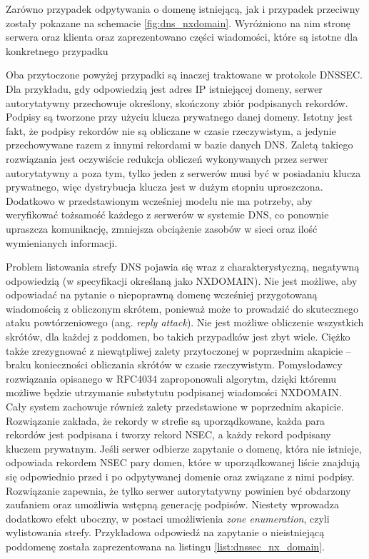 Zarówno przypadek odpytywania o domenę istniejącą, jak i przypadek przeciwny zostały pokazane na schemacie \ref{fig:dns_nxdomain}.
Wyróżniono na nim stronę serwera oraz klienta oraz zaprezentowano części wiadomości, które są istotne dla konkretnego przypadku

Oba przytoczone powyżej przypadki są inaczej traktowane w protokole DNSSEC. Dla przykładu, gdy odpowiedzią jest
adres IP istniejącej domeny, serwer autorytatywny przechowuje określony, skończony zbiór podpisanych rekordów. Podpisy są tworzone
przy użyciu klucza prywatnego danej domeny. Istotny jest fakt, że podpisy rekordów nie są obliczane w czasie rzeczywistym, a jedynie
przechowywane razem z innymi rekordami w bazie danych DNS. Zaletą takiego rozwiązania jest oczywiście redukcja obliczeń wykonywanych
przez serwer autorytatywny a poza tym, tylko jeden z serwerów musi być w posiadaniu klucza prywatnego, więc dystrybucja klucza jest w
dużym stopniu uproszczona. Dodatkowo w przedstawionym wcześniej modelu nie ma potrzeby, aby weryfikować tożsamość każdego z serwerów
w systemie DNS, co ponownie upraszcza komunikację, zmniejsza obciążenie zasobów w sieci oraz ilość wymienianych informacji.

Problem listowania strefy DNS pojawia się wraz z charakterystyczną, negatywną odpowiedzią (w specyfikacji określaną jako NXDOMAIN).
Nie jest możliwe, aby odpowiadać na pytanie o niepoprawną domenę wcześniej przygotowaną wiadomością z obliczonym skrótem, ponieważ
może to prowadzić do skutecznego ataku powtórzeniowego (ang. \textit{reply attack}). Nie jest możliwe obliczenie wszystkich skrótów,
dla każdej z poddomen, bo takich przypadków jest zbyt wiele. Ciężko także zrezygnować z niewątpliwej zalety przytoczonej w poprzednim
akapicie -- braku konieczności obliczania skrótów w czasie rzeczywistym. Pomysłodawcy rozwiązania opisanego w RFC4034 \cite{RFC4034}
zaproponowali algorytm, dzięki któremu możliwe będzie utrzymanie substytutu podpisanej wiadomości NXDOMAIN. Cały system zachowuje
również zalety przedstawione w poprzednim akapicie. Rozwiązanie zakłada, że rekordy w strefie są uporządkowane, każda para rekordów
jest podpisana i tworzy rekord NSEC, a każdy rekord podpisany kluczem prywatnym. Jeśli serwer odbierze zapytanie o domenę, która
nie istnieje, odpowiada rekordem NSEC pary domen, które w uporządkowanej liście znajdują się odpowiednio przed i po odpytywanej
domenie oraz związane z nimi podpisy. Rozwiązanie zapewnia, że tylko serwer autorytatywny powinien być obdarzony zaufaniem oraz
umożliwia wstępną generację podpisów. Niestety wprowadza dodatkowo efekt uboczny, w postaci umożliwienia \textit{zone enumeration},
czyli wylistowania strefy. Przykładowa odpowiedź na zapytanie o nieistniejącą poddomenę została zaprezentowana na listingu
\ref{list:dnssec_nx_domain}.

